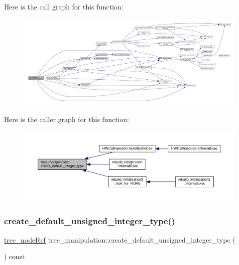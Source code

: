 Here is the call graph for this function\+:
\nopagebreak
\begin{figure}[H]
\begin{center}
\leavevmode
\includegraphics[width=350pt]{d0/d99/classtree__manipulation_a3aecb6c5af83ff4d96e6d970037d5c67_cgraph}
\end{center}
\end{figure}
Here is the caller graph for this function\+:
\nopagebreak
\begin{figure}[H]
\begin{center}
\leavevmode
\includegraphics[width=350pt]{d0/d99/classtree__manipulation_a3aecb6c5af83ff4d96e6d970037d5c67_icgraph}
\end{center}
\end{figure}
\mbox{\label{classtree__manipulation_ad82ac6edb2beb3019c28f6758665e6d8}} 
\subsubsection{\texorpdfstring{create\+\_\+default\+\_\+unsigned\+\_\+integer\+\_\+type()}{create\_default\_unsigned\_integer\_type()}}
{\footnotesize\ttfamily \hyperlink{tree__node_8hpp_a6ee377554d1c4871ad66a337eaa67fd5}{tree\+\_\+node\+Ref} tree\+\_\+manipulation\+::create\+\_\+default\+\_\+unsigned\+\_\+integer\+\_\+type (\begin{DoxyParamCaption}{ }\end{DoxyParamCaption}) const}



